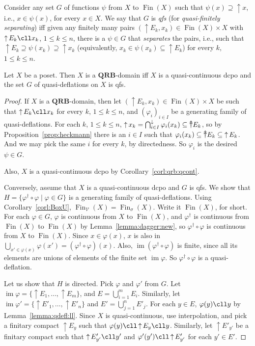 \documentclass{LMCS}
\newcommand\V{{\mathcal V}}
\newcommand\img{\mathop{\mathrm{im}}}
\newcommand\upc{\mathop{\uparrow}\nolimits}
\newcommand\uuarrow{\rlap{$\uparrow$}\raise.5ex\hbox{$\uparrow$}}\newcommand\ddarrow{\rlap{$\downarrow$}\raise.5ex\hbox{$\downarrow$}}\newcommand\Fin{\mathop{\text{Fin}}}
\newcommand\QRB{\mathbf{QRB}}
\begin{document}
Consider any set $G$ of functions $\psi$ from $X$ to $\Fin (X)$ such
that $\psi (x) \supseteq \upc x$, i.e., $x \in \psi (x)$, for every $x
\in X$.  We say that $G$ is {\em qfs\/} (for {\em quasi-finitely
  separating\/}) iff given any finitely many pairs $(\upc E_k, x_k)
\in \Fin (X) \times X$ with $\upc E_k \cll x_k$, $1\leq k\leq n$,
there is a $\psi \in G$ that {\em separates\/} the pairs, i.e., such
that $\upc E_k \supseteq \psi (x_k) \supseteq \upc x_k$ (equivalently,
$x_k \in \psi (x_k) \subseteq \upc E_k$) for every $k$, $1\leq k\leq
n$.
\begin{prop}
  \label{prop:qfs}
  Let $X$ be a poset.  Then $X$ is a $\QRB$-domain iff $X$ is a
  quasi-continuous dcpo and the set $G$ of quasi-deflations on $X$ is
  qfs.
\end{prop}
\begin{proof}
  If $X$ is a $\QRB$-domain, then let $(\upc E_k, x_k) \in \Fin (X)
  \times X$ be such that $\upc E_k \cll x_k$ for every $k$, $1\leq
  k\leq n$, and ${(\varphi_i)}_{i \in I}$ be a generating family of
  quasi-deflations.  For each $k$, $1\leq k\leq n$, $\upc x_k =
  \bigcap_{i \in I}^\downarrow \varphi_i (x_k) \subseteq \uuarrow
  E_k$, so by Proposition~\ref{prop:heckmann} there is an $i \in I$
  such that $\varphi_i (x_k) \subseteq \uuarrow E_k \subseteq \upc
  E_k$.  And we may pick the same $i$ for every $k$, by directedness.
  So $\varphi_i$ is the desired $\psi \in G$.

  Also, $X$ is a quasi-continuous dcpo by
  Corollary~\ref{corl:qrb:qcont}.

  Conversely, assume that $X$ is a quasi-continuous dcpo and $G$ is
  qfs.  We show that $H = \{\varphi^\dagger \circ \varphi \mid \varphi
  \in G\}$ is a generating family of quasi-deflations.  Using
  Corollary~\ref{corl:BoxU}, $\Fin_\V (X) = \Fin_\sigma (X)$.  Write
  it $\Fin (X)$, for short.  For each $\varphi \in G$, $\varphi$ is
  continuous from $X$ to $\Fin (X)$, and $\varphi^\dagger$ is
  continuous from $\Fin (X)$ to $\Fin (X)$ by
  Lemma~\ref{lemma:dagger:new}, so $\varphi^\dagger \circ \varphi$ is
  continuous from $X$ to $\Fin (X)$.  Since $x \in \varphi (x)$, $x$
  is also in $\bigcup_{x' \in \varphi (x)} \varphi (x') =
  (\varphi^\dagger \circ \varphi) (x)$.  Also, $\img (\varphi^\dagger
  \circ \varphi)$ is finite, since all its elements are unions of
  elements of the finite set $\img \varphi$.  So $\varphi^\dagger
  \circ \varphi$ is a quasi-deflation.

  Let us show that $H$ is directed.  Pick $\varphi$ and $\varphi'$
  from $G$.  Let $\img \varphi = \{\upc E_1, \ldots, \upc E_m\}$, and
  $E = \bigcup_{i=1}^m E_i$.  Similarly, let $\img \varphi' = \{\upc
  E'_1, \ldots, \upc E'_n\}$ and $E' = \bigcup_{j=1}^n E'_j$.  For
  each $y \in E$, $\varphi (y) \cll y$ by Lemma~\ref{lemma:qdefl:ll}.
  Since $X$ is quasi-continuous, use interpolation, and pick a
  finitary compact $\upc E_y$ such that $\varphi (y) \cll \upc E_y
  \cll y$.  Similarly, let $\upc E'_{y'}$ be a finitary compact such
  that $\upc E'_{y'} \cll y'$ and $\varphi' (y') \cll \upc E'_{y'}$
  for each $y' \in E'$.


\end{proof}
\end{document}
